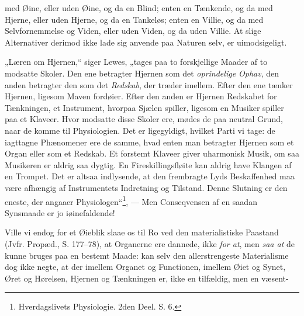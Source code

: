 \documentclass[12pt,a4paper]{book}
\begin{document}
\setcounter{footnote}{0}
med Øine, eller uden Øine, og da en Blind; enten en Tænkende, og da med Hjerne,
eller uden Hjerne, og da en Tankeløs; enten en Villie, og da med
Selvfornemmelse og Viden, eller uden Viden, og da uden Villie. At slige
Alternativer derimod ikke lade sig anvende paa Naturen selv, er uimodsigeligt.

„Læren om Hjernen,“ siger Lewes, „tages paa to forskjellige Maader af to
modsatte Skoler. Den ene betragter Hjernen som det \emph{oprindelige Ophav},
den anden betragter den som det \emph{Redskab}, der træder imellem. Efter den
ene tænker Hjernen, ligesom Maven fordøier. Efter den anden er Hjernen
Redskabet for Tænkningen, et Instrument, hvorpaa Sjælen spiller, ligesom en
Musiker spiller paa et Klaveer. Hvor modsatte disse Skoler ere, mødes de paa
neutral Grund, naar de komme til Physiologien. Det er ligegyldigt, hvilket
Parti vi tage: de iagttagne Phænomener ere de samme, hvad enten man betragter
Hjernen som et Organ eller som et Redskab. Et forstemt Klaveer giver
uharmonisk Musik, om saa Musikeren er aldrig saa dygtig. En
Fireskillingsfløite kan aldrig have Klangen af en Trompet. Det er altsaa
indlysende, at den frembragte Lyds Beskaffenhed maa være afhængig af
Instrumentets Indretning og Tilstand. Denne Slutning er den eneste, der angaaer
Physiologen“\footnote{Hverdagslivets Physiologie. 2den Deel. S. 6.}, --- Men
Conseqvensen af en saadan Synsmaade er jo iøinefaldende!

Ville vi endog for et Øieblik slaae os til Ro ved den materialistiske Paastand
(Jvfr. Propæd., S. 177--78), at Organerne ere dannede, ikke \emph{for at}, men
\emph{saa at} de kunne bruges paa en bestemt Maade: kan selv den allerstrengeste
Materialisme dog ikke negte, at der imellem Organet og Functionen, imellem Øiet
og Synet, Øret og Hørelsen, Hjernen og Tænkningen er, ikke en tilfældig, men en
væsent-
\end{document}
